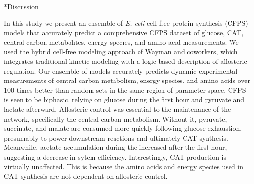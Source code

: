 \documentclass[12pt]{article}
\makeatletter
\renewcommand\section{\@startsection
	{subsection}{2}{0mm}
	{-0.2in}
	{0.05\baselineskip}
	{\normalfont\large\bfseries}}
\makeatother
\begin{document}
\clearpage

\section*{Discussion}


In this study we present an ensemble of \textit{E. coli} cell-free protein synthesis (CFPS) models that accurately predict a comprehensive CFPS dataset of glucose, CAT, central carbon metabolites, energy species, and amino acid measurements.
We used the hybrid cell-free modeling approach of Wayman and coworkers, which integrates traditional kinetic modeling with a logic-based description of allosteric regulation.
Our ensemble of models accurately predicts dynamic experimental measurements of central carbon metabolism, energy species, and amino acids over 100 times better than random sets in the same region of parameter space.
CFPS is seen to be biphasic, relying on glucose during the first hour and pyruvate and lactate afterward.
Allosteric control was essential to the maintenance of the network, specifically the central carbon metabolism.
Without it, pyruvate, succinate, and malate are consumed more quickly following glucose exhaustion, presumably to power downstream reactions and ultimately CAT synthesis.
Meanwhile, acetate accumulation during the increased after the first hour, suggesting a decrease in sytem efficiency.
Interestingly, CAT production is virtually unaffected.
This is because the amino acids and energy species used in CAT synthesis are not dependent on allosteric control.
\end{document}
